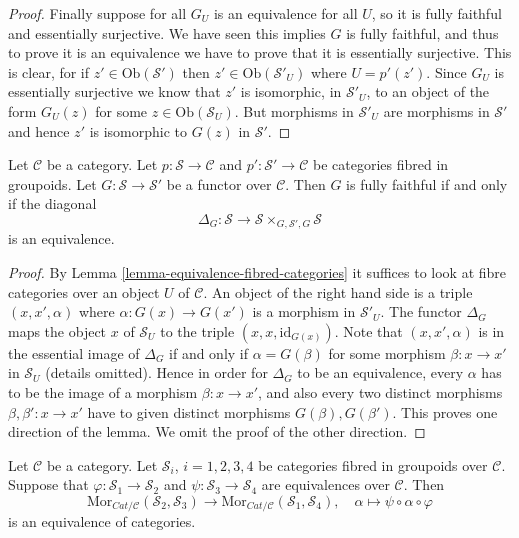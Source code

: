 \begin{proof}
\medskip\noindent
Finally suppose for all $G_U$ is an equivalence for all $U$, so it is
fully faithful and essentially surjective.  We have seen this implies $G$ is
fully faithful, and thus to prove it is an equivalence we have to prove that
it is essentially surjective.  This is clear, for if $z'\in
\text{Ob}(\mathcal{S}')$ then $z'\in \text{Ob}(\mathcal{S}'_U)$ where
$U = p'(z')$.  Since $G_U$ is essentially surjective we know that
$z'$ is isomorphic, in $\mathcal{S}'_U$, to an object of the form
$G_U(z)$ for some $z\in \text{Ob}(\mathcal{S}_U)$.  But morphisms
in $\mathcal{S}'_U$ are morphisms in $\mathcal{S}'$ and hence $z'$ is
isomorphic to $G(z)$ in $\mathcal{S}'$.
\end{proof}

\begin{lemma}
\label{lemma-fully-faithful-diagonal-equivalence}
Let $\mathcal{C}$ be a category. Let $p : \mathcal{S}\to \mathcal{C}$ and
$p' : \mathcal{S'}\to \mathcal{C}$ be categories fibred in groupoids.
Let $G : \mathcal{S}\to \mathcal {S}'$ be a functor over $\mathcal{C}$.
Then $G$ is fully faithful if and only if the diagonal
$$
\Delta_G :
\mathcal{S}
\longrightarrow
\mathcal{S} \times_{G, \mathcal{S}', G} \mathcal{S}
$$
is an equivalence.
\end{lemma}

\begin{proof}
By
Lemma \ref{lemma-equivalence-fibred-categories}
it suffices to look at fibre categories over an object $U$ of $\mathcal{C}$.
An object of the right hand side is a triple $(x, x', \alpha)$ where
$\alpha : G(x) \to G(x')$ is a morphism in $\mathcal{S}'_U$.
The functor $\Delta_G$ maps the object $x$ of $\mathcal{S}_U$
to the triple $(x, x, \text{id}_{G(x)})$. Note that $(x, x', \alpha)$
is in the essential image of $\Delta_G$ if and only if $\alpha = G(\beta)$
for some morphism $\beta : x \to x'$ in $\mathcal{S}_U$ (details omitted).
Hence in order for $\Delta_G$ to be an equivalence, every $\alpha$ has to
be the image of a morphism $\beta : x \to x'$, and also every two
distinct morphisms $\beta, \beta' : x \to x'$ have to given distinct
morphisms $G(\beta), G(\beta')$. This proves one direction of the lemma.
We omit the proof of the other direction.
\end{proof}

\begin{lemma}
\label{lemma-morphisms-equivalent-fibred-groupoids}
Let $\mathcal{C}$ be a category.
Let $\mathcal{S}_i$, $i = 1, 2, 3, 4$ be categories fibred in
groupoids over $\mathcal{C}$.
Suppose that $\varphi : \mathcal{S}_1 \to \mathcal{S}_2$ and
$\psi : \mathcal{S}_3 \to \mathcal{S}_4$ are equivalences
over $\mathcal{C}$. Then
$$
\text{Mor}_{\textit{Cat}/\mathcal{C}}(\mathcal{S}_2, \mathcal{S}_3)
\longrightarrow
\text{Mor}_{\textit{Cat}/\mathcal{C}}(\mathcal{S}_1, \mathcal{S}_4),
\quad \alpha \longmapsto \psi \circ \alpha \circ \varphi
$$
is an equivalence of categories.
\end{lemma}


